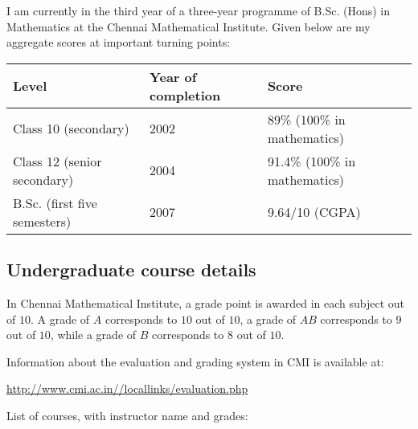 \documentclass[12pt,a4paper,oneside]{amsart}
\begin{document}
I am currently in the third year of a three-year programme of B.Sc.
(Hons) in Mathematics at the Chennai Mathematical Institute. Given below
are my aggregate scores at important turning points:

\vspace{0.25in}
\begin{tabular}{|l|l|l|}
  \hline
  Level & Year of completion & Score\\
  \hline
  Class 10 (secondary) & 2002 &  89\% (100\% in mathematics)\\
  Class 12 (senior secondary) & 2004  & 91.4\% (100\% in mathematics)\\
  B.Sc. (first five semesters) & 2007 & 9.64/10 (CGPA)\\
  \hline
\end{tabular}
\vspace{0.25in}

\newpage
\vspace{0.25in}
\subsection{Undergraduate course details}

In Chennai Mathematical Institute, a grade point is awarded in each
subject out of $10$. A grade of $A$ corresponds to $10$ out of $10$, a
grade of $AB$ corresponds to $9$ out of $10$, while a grade of $B$
corresponds to $8$ out of $10$.

Information about the evaluation and grading system in CMI is available at:

\url{http://www.cmi.ac.in//locallinks/evaluation.php}

List of courses, with instructor name and grades:
\end{document}
